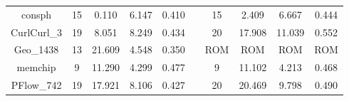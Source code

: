 \begin{table}[htpb]
\begin{tabular}{c|c|c|c|c|c|c|c|c|c|}
\multicolumn{1}{|c|}{consph}                                                & 15  & 0.110                                                                 & 6.147                                              & 0.410                                                  &  & 15  & 2.409                                                                 & 6.667                                              & 0.444                                                  \\ \cline{1-5} \cline{7-10} 
\multicolumn{1}{|c|}{CurlCurl\_3}                                           & 19  & 8.051                                                                 & 8.249                                              & 0.434                                                  &  & 20  & 17.908                                                                & 11.039                                             & 0.552                                                  \\ \cline{1-5} \cline{7-10} 
\multicolumn{1}{|c|}{Geo\_1438}                                             & 13  & 21.609                                                                & 4.548                                              & 0.350                                                  &  & ROM & ROM                                                                   & ROM                                                & ROM                                                    \\ \cline{1-5} \cline{7-10} 
\multicolumn{1}{|c|}{memchip}                                               & 9   & 11.290                                                                & 4.299                                              & 0.477                                                  &  & 9   & 11.102                                                                & 4.213                                              & 0.468                                                  \\ \cline{1-5} \cline{7-10} 
\multicolumn{1}{|c|}{PFlow\_742}                                            & 19  & 17.921                                                                & 8.106                                              & 0.427                                                  &  & 20  & 20.469                                                                & 9.798                                              & 0.490                                                  \\ \cline{1-5} \cline{7-10} 

\end{tabular}
\end{table}
